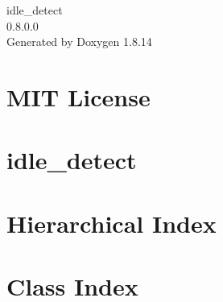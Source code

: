 \documentclass[twoside]{book}
\newcommand{\+}{\discretionary{\mbox{\scriptsize$\hookleftarrow$}}{}{}}
\newcommand{\clearemptydoublepage}{%
  \newpage{\pagestyle{empty}\cleardoublepage}%
}
\begin{document}
\hypersetup{pageanchor=false,
             bookmarksnumbered=true,
             pdfencoding=unicode
            }
\begin{titlepage}
\vspace*{7cm}
\begin{center}%
{\Large idle\+\_\+detect \\[1ex]\large 0.\+8.\+0.\+0 }\\
\vspace*{1cm}
{\large Generated by Doxygen 1.8.14}\\
\end{center}
\end{titlepage}
\clearemptydoublepage
{}
\tableofcontents
\clearemptydoublepage
{}
\hypersetup{pageanchor=true}

\chapter{M\+IT License}
\label{md_LICENSE}

\chapter{idle\+\_\+detect}
\label{md_README}

\chapter{Hierarchical Index}

\chapter{Class Index}

\end{document}

